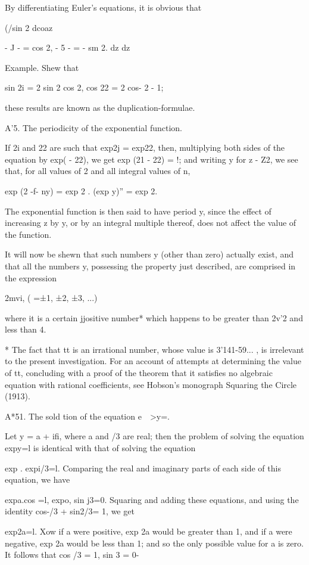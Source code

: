 By differentiating Euler's equations, it is obvious that

(/sin 2 dcoaz

- J - = cos 2, - 5 - = - sm 2. dz dz

Example. Shew that

sin 2i = 2 sin 2 cos 2, cos 22 = 2 cos- 2 - 1;

these results are known as the duplication-formulae.

A'5. The periodicity of the exponential function.

If 2i and 22 are such that exp2j = exp22, then, multiplying both sides
of the equation by exp( - 22), we get exp (21 - 22) = !; and writing
y for z - Z2, we see that, for all values of 2 and all integral values
of n,

exp (2 -f- ny) = exp 2 . (exp y)'' = exp 2.

The exponential function is then said to have period y, since the
effect of increasing z by y, or by an integral multiple thereof, does
not affect the value of the function.

It will now be shewn that such numbers y (other than zero) actually
exist, and that all the numbers y, possessing the property just
described, are comprised in the expression

2mvi, ( =±1, ±2, ±3, ...)

where it is a certain jjositive number* which happens to be greater
than 2v'2 and less than 4.

* The fact that tt is an irrational number, whose value is 3'141-59...
, is irrelevant to the present investigation. For an account of
attempts at determining the value of tt, concluding with a proof of
the theorem that it satisfies no algebraic equation with rational
coefficients, see Hobson's monograph Squaring the Circle (1913).

%
%

A*51. The sold tion of the equation e\ \ >y=.

Let y = a + ifi, where a and /3 are real; then the problem of solving
the equation expy=l is identical with that of solving the equation

exp . expi/3=l. Comparing the real and imaginary parts of each side of
this equation, we have

expa.cos =l, expo, sin j3=0. Squaring and adding these equations, and
using the identity cos-/3 + sin2/3= 1, we get

exp2a=l. Xow if a were positive, exp 2a would be greater than 1, and
if a were negative, exp 2a would be less than 1; and so the only
possible value for a is zero. It follows that cos /3 = 1, sin 3 = 0-

